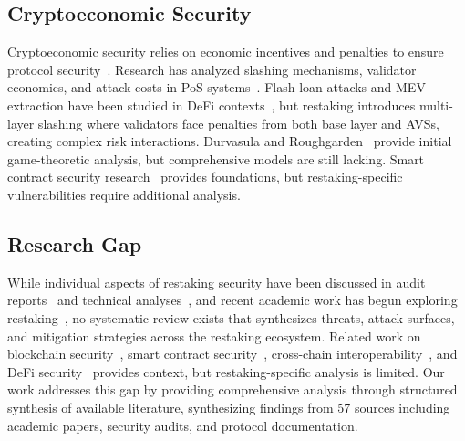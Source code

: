 \documentclass[runningheads]{llncs}
\begin{document}
\subsection{Cryptoeconomic Security}

Cryptoeconomic security relies on economic incentives and penalties to ensure protocol security~\cite{zhou2020high,zhou2021high,chen2021sok,qin2021atomic}. Research has analyzed slashing mechanisms, validator economics, and attack costs in PoS systems~\cite{kiayias2017ouroboros,buterin2017casper}. Flash loan attacks and MEV extraction have been studied in DeFi contexts~\cite{gao2021flashloan,zhou2020high,zhou2021high,chen2021sok}, but restaking introduces multi-layer slashing where validators face penalties from both base layer and AVSs, creating complex risk interactions. Durvasula and Roughgarden~\cite{durvasula2024robust} provide initial game-theoretic analysis, but comprehensive models are still lacking. Smart contract security research~\cite{huang2021survey,chen2020defining,ahmed2021survey,luu2016making,rodler2018sereum} provides foundations, but restaking-specific vulnerabilities require additional analysis.

\subsection{Research Gap}

While individual aspects of restaking security have been discussed in audit reports~\cite{certora2025,code4rena2023,trailofbits2024,openzeppelin2024,consensys2024restaking} and technical analyses~\cite{blocksec2024,sigmaprime2024,cobo2024,okx2024}, and recent academic work has begun exploring restaking~\cite{durvasula2024robust,zhang2024proof,li2024mitigating,das2025reliablocks}, no systematic review exists that synthesizes threats, attack surfaces, and mitigation strategies across the restaking ecosystem. Related work on blockchain security~\cite{li2022survey,zhou2022state}, smart contract security~\cite{huang2021survey,chen2020defining,atzei2017survey}, cross-chain interoperability~\cite{zhang2022cross,li2021sovereign,wang2023survey,belchior2021survey,li2023survey}, and DeFi security~\cite{chen2021sok,gao2021flashloan} provides context, but restaking-specific analysis is limited. Our work addresses this gap by providing comprehensive analysis through structured synthesis of available literature, synthesizing findings from 57 sources including academic papers, security audits, and protocol documentation.

\vspace{-0.3cm}
\end{document}
